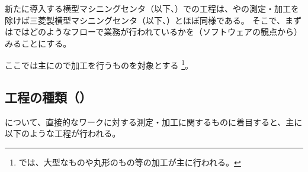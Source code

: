 

新たに導入する横型マシニングセンタ（以下、\textbf{\DMC}）での工程は、\Dimple や\ReliefGroove の測定・加工を除けば三菱製横型マシニングセンタ（以下、\textbf{\MMC}）とほぼ同様である。
そこで、まずは\MMC ではどのようなフローで業務が行われているかを（ソフトウェアの観点から）みることにする。
\begin{marker}
ここでは主に\MMC の\nameNoOnePalette で加工を行うものを対象とする
\footnote{\nameNoTwoPalette では、大型なものや丸形のもの等の加工が主に行われる。}。
\end{marker}





\subsection{工程の種類（\yomiMMC）}
\MMC について、直接的なワークに対する測定・加工に関するものに着目すると、主に以下のような工程が行われる。\\

